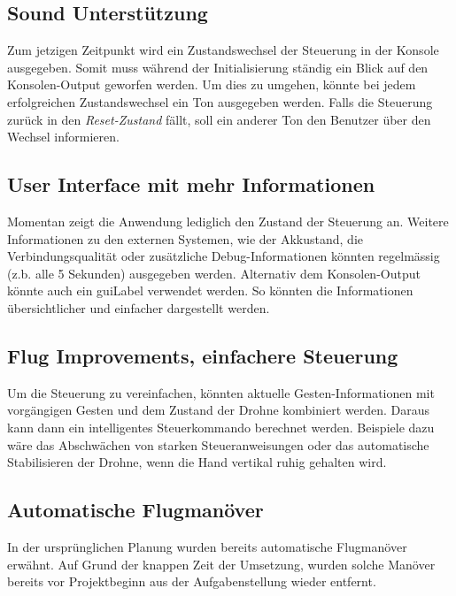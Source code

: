 \subsection{Sound Unterstützung}
Zum jetzigen Zeitpunkt wird ein Zustandswechsel der Steuerung in der Konsole ausgegeben.
Somit muss während der Initialisierung ständig ein Blick auf den Konsolen-Output geworfen werden.
Um dies zu umgehen, könnte bei jedem erfolgreichen Zustandswechsel ein Ton ausgegeben werden.
Falls die Steuerung zurück in den \textit{Reset-Zustand} fällt, soll ein anderer Ton den Benutzer über den Wechsel informieren.

\subsection{User Interface mit mehr Informationen}
Momentan zeigt die Anwendung lediglich den Zustand der Steuerung an.
Weitere Informationen zu den externen Systemen, wie der Akkustand, die Verbindungsqualität oder zusätzliche Debug-Informationen könnten regelmässig (z.b. alle 5 Sekunden) ausgegeben werden.
Alternativ dem Konsolen-Output könnte auch ein \gls{guiLabel} verwendet werden. So könnten die Informationen übersichtlicher und einfacher dargestellt werden.

\subsection{Flug Improvements, einfachere Steuerung}
Um die Steuerung zu vereinfachen, könnten aktuelle Gesten-Informationen mit vorgängigen Gesten und dem Zustand der Drohne kombiniert werden. Daraus kann dann ein intelligentes Steuerkommando berechnet werden.
Beispiele dazu wäre das Abschwächen von starken Steueranweisungen oder das automatische Stabilisieren der Drohne, wenn die Hand vertikal ruhig gehalten wird.

\newpage
\subsection{Automatische Flugmanöver}
In der ursprünglichen Planung wurden bereits automatische Flugmanöver erwähnt.
Auf Grund der knappen Zeit der Umsetzung, wurden solche Manöver bereits vor Projektbeginn aus der Aufgabenstellung wieder entfernt.

